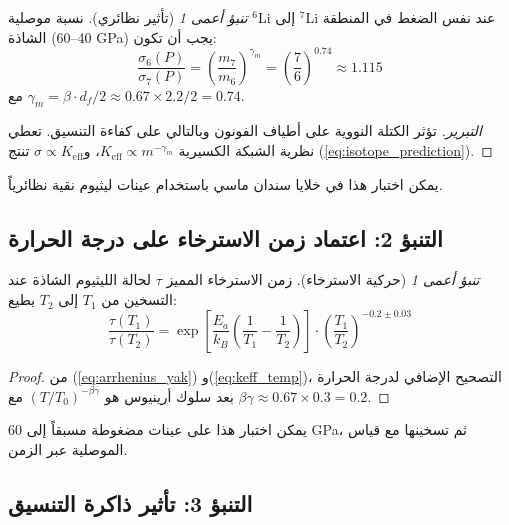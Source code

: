 \documentclass[12pt,a4paper]{article}
\newcommand{\Ke}{K_{\mathrm{eff}}}
\newcommand{\df}{d_{\!f}}
\theoremstyle{remark}
\newtheorem{prediction}[theorem]{تنبؤ أعمى}
\begin{document}
	\begin{prediction}[تأثير نظائري]
		نسبة موصلية \(^6\)Li إلى \(^7\)Li عند نفس الضغط في المنطقة الشاذة (40–60 GPa) يجب أن تكون:
		\begin{equation}
			\frac{\sigma_6(P)}{\sigma_7(P)} = \left( \frac{m_7}{m_6} \right)^{\gamma_m} = \left( \frac{7}{6} \right)^{0.74} \approx 1.115
			\label{eq:isotope_prediction}
		\end{equation}
		مع \(\gamma_m = \beta \cdot \df / 2 \approx 0.67 \times 2.2 / 2 = 0.74\).
		\label{pred:isotope}
	\end{prediction}
	
	\begin{proof}[التبرير]
		تؤثر الكتلة النووية على أطياف الفونون وبالتالي على كفاءة التنسيق. تعطي نظرية الشبكة الكسيرية \(\Ke \propto m^{-\gamma_m}\)، و\(\sigma \propto \Ke\) تنتج (\ref{eq:isotope_prediction}).
	\end{proof}
	
	يمكن اختبار هذا في خلايا سندان ماسي باستخدام عينات ليثيوم نقية نظائرياً.
	
	\subsection{التنبؤ 2: اعتماد زمن الاسترخاء على درجة الحرارة}
	
	\begin{prediction}[حركية الاسترخاء]
		زمن الاسترخاء المميز \(\tau\) لحالة الليثيوم الشاذة عند التسخين من \(T_1\) إلى \(T_2\) يطيع:
		\begin{equation}
			\frac{\tau(T_1)}{\tau(T_2)} = \exp\left[ \frac{E_a}{k_B} \left( \frac{1}{T_1} - \frac{1}{T_2} \right) \right] \cdot \left( \frac{T_1}{T_2} \right)^{-0.2 \pm 0.03}
			\label{eq:relaxation_prediction}
		\end{equation}
		\label{pred:relaxation}
	\end{prediction}
	
	\begin{proof}
		من (\ref{eq:arrhenius_yak}) و(\ref{eq:keff_temp})، التصحيح الإضافي لدرجة الحرارة بعد سلوك أرينيوس هو \((T/T_0)^{-\beta\gamma}\) مع \(\beta\gamma \approx 0.67 \times 0.3 = 0.2\).
	\end{proof}
	
	يمكن اختبار هذا على عينات مضغوطة مسبقاً إلى 60 GPa، ثم تسخينها مع قياس الموصلية عبر الزمن.
	
	\subsection{التنبؤ 3: تأثير ذاكرة التنسيق}
	
\end{document}
